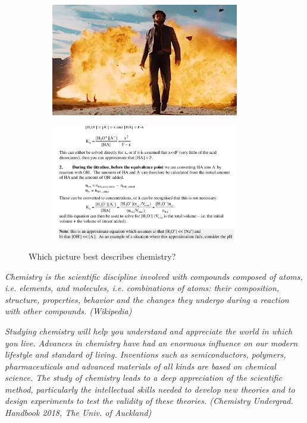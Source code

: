 \documentclass[a4paper]{memoir}
\begin{document}
\begin{figure}
  \begin{subfigure}[t]{0.45\textwidth}
    \centering
    \includegraphics[width=0.9\textwidth]{chem5}
  \end{subfigure}%
  \begin{subfigure}[t]{0.45\textwidth}
    \centering
    \includegraphics[width=0.9\textwidth]{chem6}
  \end{subfigure}
  \caption{Which picture best describes chemistry?\label{fig:chem}}
\end{figure}
\begin{center}
  \itshape
  Chemistry is the scientific discipline involved with compounds composed of atoms, i.e. elements, and molecules, i.e. combinations of atoms: their composition, structure, properties, behavior and the changes they undergo during a reaction with other compounds. (Wikipedia)
\end{center}

\begin{center}
  \itshape
  Studying chemistry will help you understand and appreciate the world in which you live. Advances in chemistry have had an enormous influence on our modern lifestyle and standard of living. Inventions such as semiconductors, polymers, pharmaceuticals and advanced materials of all kinds are based on chemical science. The study of chemistry leads to a deep appreciation of the scientific method, particularly the intellectual skills needed to develop new theories and to design experiments to test the validity of these theories. (Chemistry Undergrad. Handbook 2018, The Univ. of Auckland)
\end{center}
\end{document}
